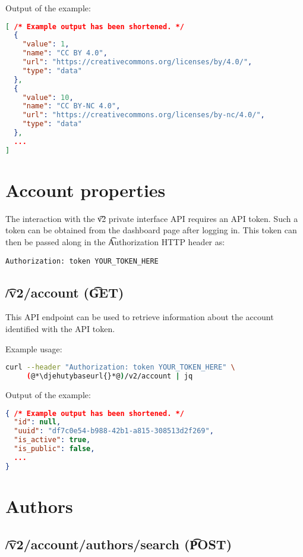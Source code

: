   Output of the example:
\begin{lstlisting}[language=JSON]
[ /* Example output has been shortened. */
  {
    "value": 1,
    "name": "CC BY 4.0",
    "url": "https://creativecommons.org/licenses/by/4.0/",
    "type": "data"
  },
  {
    "value": 10,
    "name": "CC BY-NC 4.0",
    "url": "https://creativecommons.org/licenses/by-nc/4.0/",
    "type": "data"
  },
  ...
]
\end{lstlisting}

\section{Account properties}

  The interaction with the \t{v2} private interface API requires an API token.
  Such a token can be obtained from the dashboard page after logging in.  This
  token can then be passed along in the \t{Authorization} HTTP header as:
\begin{lstlisting}
Authorization: token YOUR_TOKEN_HERE
\end{lstlisting}

\subsection{\t{/v2/account} (\t{GET})}

  This API endpoint can be used to retrieve information about the account
  identified with the API token.

  Example usage:
\begin{lstlisting}[language=bash]
curl --header "Authorization: token YOUR_TOKEN_HERE" \
     (@*\djehutybaseurl{}*@)/v2/account | jq
\end{lstlisting}

  Output of the example:
\begin{lstlisting}[language=JSON]
{ /* Example output has been shortened. */
  "id": null,
  "uuid": "df7c0e54-b988-42b1-a815-308513d2f269",
  "is_active": true,
  "is_public": false,
  ...
}
\end{lstlisting}

\section{Authors}

\subsection{\t{/v2/account/authors/search} (\t{POST})}

